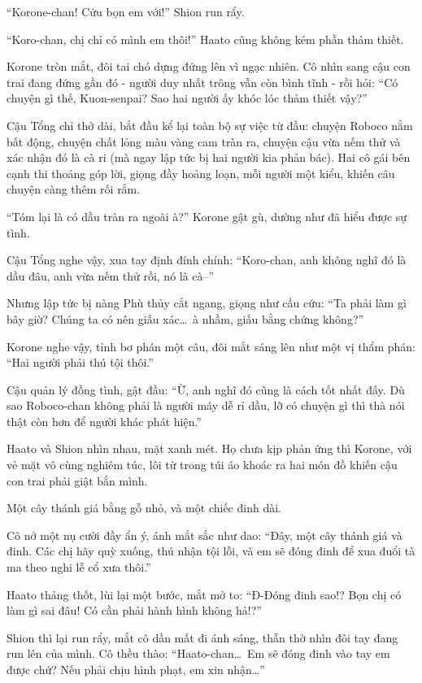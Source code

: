 \documentclass[../main.tex]{subfiles}
\begin{document}
``Korone-chan! Cứu bọn em với!''  Shion run rẩy.

``Koro-chan, chị chỉ có mình em thôi!''  Haato cũng không kém phần thảm thiết.


Korone tròn mắt, đôi tai chó dựng đứng lên vì ngạc nhiên. Cô nhìn sang cậu con trai đang đứng gần đó - người duy nhất trông vẫn còn bình tĩnh - rồi hỏi: ``Có chuyện gì thế, Kuon-senpai? Sao hai người ấy khóc lóc thảm thiết vậy?''

Cậu Tổng chỉ thở dài, bắt đầu kể lại toàn bộ sự việc từ đầu: chuyện Roboco nằm bất động, chuyện chất lỏng màu vàng cam tràn ra, chuyện cậu vừa nếm thử và xác nhận đó là cà ri (mà ngay lập tức bị hai người kia phản bác). Hai cô gái bên cạnh thi thoảng góp lời, giọng đầy hoảng loạn, mỗi người một kiểu, khiến câu chuyện càng thêm rối rắm.

``Tóm lại là có dầu tràn ra ngoài à?''  Korone gật gù, dường như đã hiểu được sự tình.

Cậu Tổng nghe vậy, xua tay định đính chính: ``Koro-chan, anh không nghĩ đó là dầu đâu, anh vừa nếm thử rồi, nó là cà--''

Nhưng lập tức bị nàng Phù thủy cắt ngang, giọng như cầu cứu: ``Ta phải làm gì bây giờ? Chúng ta có nên giấu xác\dots\ à nhầm, giấu bằng chứng không?''

Korone nghe vậy, tỉnh bơ phán một câu, đôi mắt sáng lên như một vị thẩm phán: ``Hai người phải thú tội thôi.''

Cậu quản lý đồng tình, gật đầu: ``Ừ, anh nghĩ đó cũng là cách tốt nhất đấy. Dù sao Roboco-chan không phải là người máy dễ rỉ dầu, lỡ có chuyện gì thì thà nói thật còn hơn để người khác phát hiện.''

Haato và Shion nhìn nhau, mặt xanh mét. Họ chưa kịp phản ứng thì Korone, với vẻ mặt vô cùng nghiêm túc, lôi từ trong túi áo khoác ra hai món đồ khiến cậu con trai phải giật bắn mình.

Một cây thánh giá bằng gỗ nhỏ, và một chiếc đinh dài.

Cô nở một nụ cười đầy ẩn ý, ánh mắt sắc như dao: ``Đây, một cây thánh giá và đinh. Các chị hãy quỳ xuống, thú nhận tội lỗi, và em sẽ đóng đinh để xua đuổi tà ma theo nghi lễ cổ xưa thôi.''


Haato thảng thốt, lùi lại một bước, mắt mở to: ``Đ-Đóng đinh sao!? Bọn chị có làm gì sai đâu! Có cần phải hành hình không hả!?''

Shion thì lại run rẩy, mắt cô dần mất đi ánh sáng, thẫn thờ nhìn đôi tay đang run lên của mình. Cô thều thào: ``Haato-chan\dots\ Em sẽ đóng đinh vào tay em được chứ? Nếu phải chịu hình phạt, em xin nhận\dots''
\end{document}
